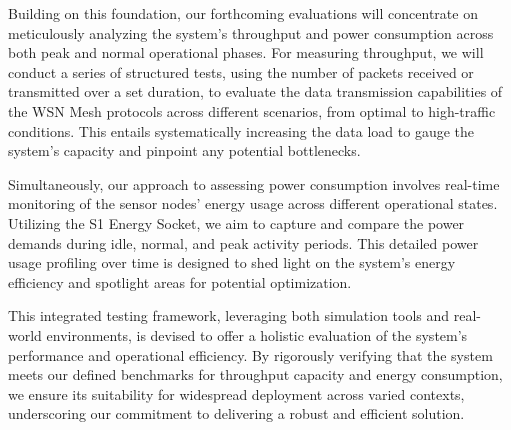 Building on this foundation, our forthcoming evaluations will concentrate on meticulously analyzing the system's throughput and power consumption across both peak and normal operational phases. For measuring throughput, we will conduct a series of structured tests, using the number of packets received or transmitted over a set duration, to evaluate the data transmission capabilities of the WSN Mesh protocols across different scenarios, from optimal to high-traffic conditions. This entails systematically increasing the data load to gauge the system's capacity and pinpoint any potential bottlenecks.

Simultaneously, our approach to assessing power consumption involves real-time monitoring of the sensor nodes' energy usage across different operational states. Utilizing the S1 Energy Socket, we aim to capture and compare the power demands during idle, normal, and peak activity periods. This detailed power usage profiling over time is designed to shed light on the system's energy efficiency and spotlight areas for potential optimization.

This integrated testing framework, leveraging both simulation tools and real-world environments, is devised to offer a holistic evaluation of the system's performance and operational efficiency. By rigorously verifying that the system meets our defined benchmarks for throughput capacity and energy consumption, we ensure its suitability for widespread deployment across varied contexts, underscoring our commitment to delivering a robust and efficient solution.
